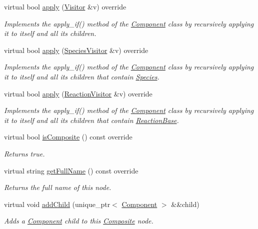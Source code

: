 \begin{DoxyCompactItemize}
virtual bool \hyperlink{classComposite_a58123ab346f6621a187bebe456e383ea}{apply} (\hyperlink{classVisitor}{Visitor} \&v) override
\begin{DoxyCompactList}\small\item\em Implements the apply\+\_\+if() method of the \hyperlink{classComponent}{Component} class by recursively applying it to itself and all its children. \end{DoxyCompactList}\item 
virtual bool \hyperlink{classComposite_a18937a1f6f84a159e77ba83dd34b2e20}{apply} (\hyperlink{classSpeciesVisitor}{Species\+Visitor} \&v) override
\begin{DoxyCompactList}\small\item\em Implements the apply\+\_\+if() method of the \hyperlink{classComponent}{Component} class by recursively applying it to itself and all its children that contain \hyperlink{classSpecies}{Species}. \end{DoxyCompactList}\item 
virtual bool \hyperlink{classComposite_aa4a608ee92aaaa6e0d63278595707474}{apply} (\hyperlink{classReactionVisitor}{Reaction\+Visitor} \&v) override
\begin{DoxyCompactList}\small\item\em Implements the apply\+\_\+if() method of the \hyperlink{classComponent}{Component} class by recursively applying it to itself and all its children that contain \hyperlink{classReactionBase}{Reaction\+Base}. \end{DoxyCompactList}\item 
virtual bool \hyperlink{classComposite_ae2c806010c5c1d2d166ce01f2710c271}{is\+Composite} () const override
\begin{DoxyCompactList}\small\item\em Returns true. \end{DoxyCompactList}\item 
virtual string \hyperlink{classComposite_a0219bb2449696a3ab84ff24e4462e2c2}{get\+Full\+Name} () const override
\begin{DoxyCompactList}\small\item\em Returns the full name of this node. \end{DoxyCompactList}\item 
virtual void \hyperlink{classComposite_aa3ebdb54e65379954e5f28cd84f00be0}{add\+Child} (unique\+\_\+ptr$<$ \hyperlink{classComponent}{Component} $>$ \&\&child)
\begin{DoxyCompactList}\small\item\em Adds a \hyperlink{classComponent}{Component} child to this \hyperlink{classComposite}{Composite} node. \end{DoxyCompactList}\item 

\end{DoxyCompactItemize}
